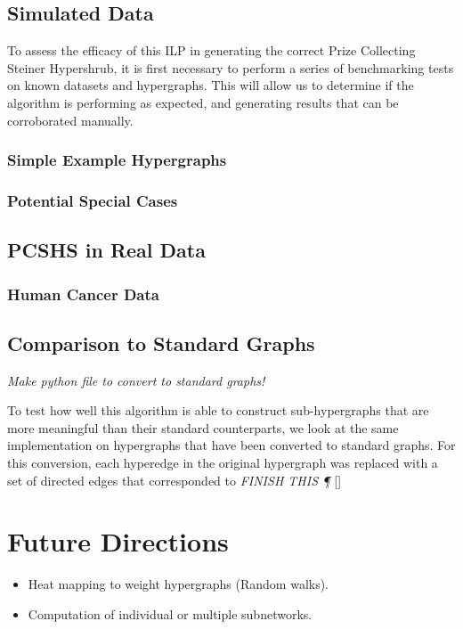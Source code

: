 \documentclass[12pt,twoside]{reedthesis}
\newcommand{\new}[2]{{\color{purple}#1 [#2]}}
\theoremstyle{definition}
\begin{document}
  \section{Simulated Data}

  To assess the efficacy of this ILP in generating the correct Prize Collecting Steiner Hypershrub, it is first necessary to perform a series of benchmarking tests on known datasets and hypergraphs.  This will allow us to determine if the algorithm is performing as expected, and generating results that can be corroborated manually.\par

  \subsection{Simple Example Hypergraphs}

  \subsection{Potential Special Cases}

  \section{PCSHS in Real Data}

   \subsection{Human Cancer Data}

  \section{Comparison to Standard Graphs}

  \emph{Make python file to convert to standard graphs!}

  \new{To test how well this algorithm is able to construct sub-hypergraphs that are more meaningful than their standard counterparts, we look at the same implementation on hypergraphs that have been converted to standard graphs. For this conversion, each hyperedge in the original hypergraph was replaced with a set of directed edges that corresponded to \emph{FINISH THIS \P}}{}

\chapter{Future Directions}
 \begin{itemize}
   \item{Heat mapping to weight hypergraphs (Random walks).}
   \item{Computation of individual or multiple subnetworks.}
 \end{itemize}
\end{document}
